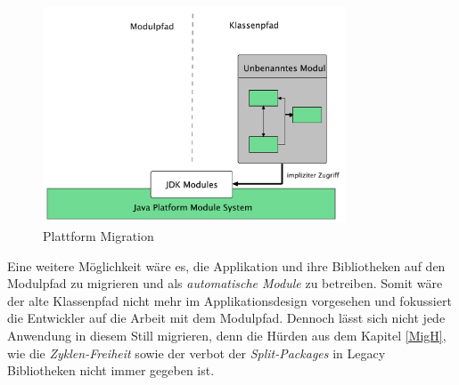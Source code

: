 	\begin{figure}[h]
		\centering
	    \includegraphics[width=0.8\textwidth]{material/images/platform-migrate.pdf}
	    \caption{Plattform Migration \cite{modulMitJava9}}
	    \label{fig:PM}
  	\end{figure}

	Eine weitere Möglichkeit wäre es, die Applikation und ihre Bibliotheken auf den Modulpfad zu migrieren und als \textit{automatische Module} zu betreiben. Somit wäre der alte Klassenpfad  nicht mehr im Applikationsdesign vorgesehen und fokussiert die Entwickler auf die Arbeit mit dem Modulpfad. Dennoch lässt sich nicht jede Anwendung in diesem Still migrieren, denn die Hürden aus dem Kapitel \ref{MigH}, wie die \textit{Zyklen-Freiheit} sowie der verbot der \textit{Split-Packages} in Legacy Bibliotheken nicht immer gegeben ist. 



